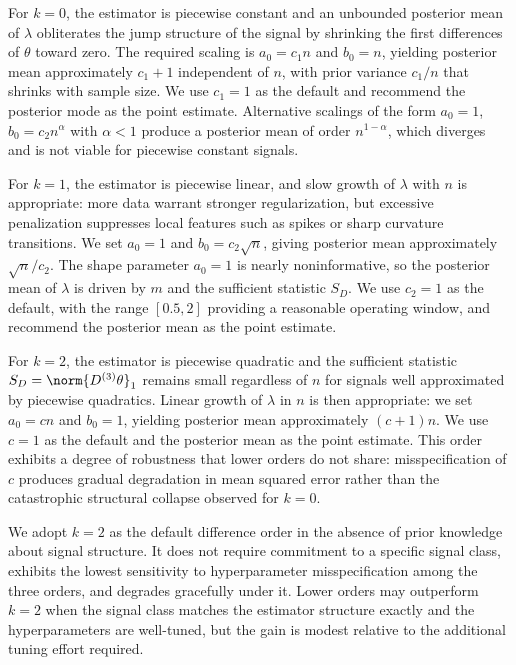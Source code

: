For $k = 0$, the estimator is piecewise constant and an unbounded posterior mean of $\lambda$ obliterates the jump structure of the signal by shrinking the first differences of $\theta$ toward zero. The required scaling is $a_0 = c_1 n$ and $b_0 = n$, yielding posterior mean approximately $c_1 + 1$ independent of $n$, with prior variance $c_1/n$ that shrinks with sample size. We use $c_1 = 1$ as the default and recommend the posterior mode as the point estimate. Alternative scalings of the form $a_0 = 1$, $b_0 = c_2 n^\alpha$ with $\alpha < 1$ produce a posterior mean of order $n^{1-\alpha}$, which diverges and is not viable for piecewise constant signals.

For $k = 1$, the estimator is piecewise linear, and slow growth of $\lambda$ with $n$ is appropriate: more data warrant stronger regularization, but excessive penalization suppresses local features such as spikes or sharp curvature transitions. We set $a_0 = 1$ and $b_0 = c_2 \sqrt{n}$, giving posterior mean approximately $\sqrt{n}/c_2$. The shape parameter $a_0 = 1$ is nearly noninformative, so the posterior mean of $\lambda$ is driven by $m$ and the sufficient statistic $S_D$. We use $c_2 = 1$ as the default, with the range $[0.5, 2]$ providing a reasonable operating window, and recommend the posterior mean as the point estimate.

For $k = 2$, the estimator is piecewise quadratic and the sufficient statistic $S_D = \norm{D^{(3)}\theta}_1$ remains small regardless of $n$ for signals well approximated by piecewise quadratics. Linear growth of $\lambda$ in $n$ is then appropriate: we set $a_0 = c n$ and $b_0 = 1$, yielding posterior mean approximately $(c+1)n$. We use $c = 1$ as the default and the posterior mean as the point estimate. This order exhibits a degree of robustness that lower orders do not share: misspecification of $c$ produces gradual degradation in mean squared error rather than the catastrophic structural collapse observed for $k = 0$.

We adopt $k = 2$ as the default difference order in the absence of prior knowledge about signal structure. It does not require commitment to a specific signal class, exhibits the lowest sensitivity to hyperparameter misspecification among the three orders, and degrades gracefully under it. Lower orders may outperform $k = 2$ when the signal class matches the estimator structure exactly and the hyperparameters are well-tuned, but the gain is modest relative to the additional tuning effort required.

